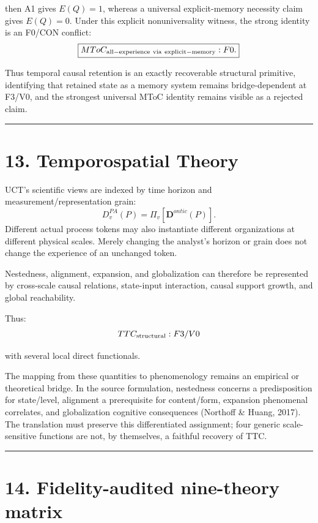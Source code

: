 \documentclass[
  11pt,
  a4paper,
]{article}
\begin{document}
then A1 gives \(E(Q)=1\), whereas a universal explicit-memory necessity
claim gives \(E(Q)=0\). Under this explicit nonuniversality witness, the
strong identity is an F0/CON conflict:
\nopagebreak[4]
\[
\boxed{
MToC_{\rm all-experience\ via\ explicit-memory}:F0.
}
\]

Thus temporal causal retention is an exactly recoverable structural
primitive, identifying that retained state as a memory system remains
bridge-dependent at F3/V0, and the strongest universal MToC identity
remains visible as a rejected claim.

\begin{center}\rule{0.5\linewidth}{0.5pt}\end{center}

\hypertarget{temporospatial-theory}{%
\section{13. Temporospatial Theory}\label{temporospatial-theory}}

UCT's scientific views are indexed by time horizon and
measurement/representation grain: \[
D^{PA}_v(P)=\Pi_v[\mathbf D^{ontic}(P)].
\] Different actual process tokens may also instantiate different
organizations at different physical scales. Merely changing the
analyst's horizon or grain does not change the experience of an
unchanged token.

Nestedness, alignment, expansion, and globalization can therefore be
represented by cross-scale causal relations, state-input interaction,
causal support growth, and global reachability.

Thus:
\nopagebreak[4]
\[
TTC_{\rm structural}:F3/V0
\]

with several local direct functionals.

The mapping from these quantities to phenomenology remains an empirical
or theoretical bridge. In the source formulation, nestedness concerns a
predisposition for state/level, alignment a prerequisite for
content/form, expansion phenomenal correlates, and globalization
cognitive consequences (Northoff \& Huang, 2017). The translation must
preserve this differentiated assignment; four generic scale-sensitive
functions are not, by themselves, a faithful recovery of TTC.

\begin{center}\rule{0.5\linewidth}{0.5pt}\end{center}

\hypertarget{fidelity-audited-nine-theory-matrix}{%
\section{14. Fidelity-audited nine-theory
matrix}\label{fidelity-audited-nine-theory-matrix}}
\end{document}
